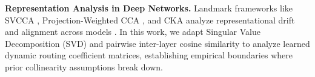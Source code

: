 \textbf{Representation Analysis in Deep Networks.} Landmark frameworks like SVCCA \cite{raghu2017svcca}, Projection-Weighted CCA \cite{morcos2018insights}, and CKA \cite{kornblith2019similarity} analyze representational drift and alignment across models \cite{conwell2021what, sucholutsky2023getting}. In this work, we adapt Singular Value Decomposition (SVD) and pairwise inter-layer cosine similarity to analyze learned dynamic routing coefficient matrices, establishing empirical boundaries where prior collinearity assumptions break down.
